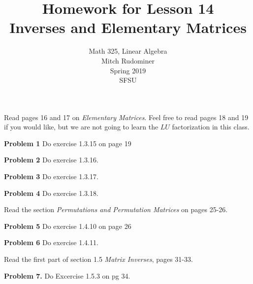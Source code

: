 \documentclass[oneside,12pt]{amsart}
\begin{document}
\title{Homework for Lesson 14 \\ Inverses and Elementary Matrices}
\author{Math 325, Linear Algebra \\ Mitch Rudominer \\ Spring 2019 \\ SFSU }
\date{}

\maketitle

\bigskip

Read pages 16 and 17 on \emph{Elementary Matrices}. Feel free to read pages
18 and 19 if you would like, but we are not going to learn the $LU$
factorization in this class.

\textbf{Problem 1} Do exercise 1.3.15 on page 19

\bigskip
\bigskip
\bigskip
\bigskip
\bigskip
\bigskip
\bigskip
\bigskip
\bigskip
\bigskip

\textbf{Problem 2} Do exercise 1.3.16.


\bigskip
\bigskip
\bigskip
\bigskip
\bigskip
\bigskip
\bigskip
\bigskip
\bigskip
\bigskip

\textbf{Problem 3} Do exercise 1.3.17.

\bigskip
\bigskip
\bigskip
\bigskip
\bigskip
\bigskip
\bigskip
\bigskip
\bigskip
\bigskip

\textbf{Problem 4} Do exercise 1.3.18.

\bigskip
\bigskip
\bigskip
\bigskip
\bigskip
\bigskip
\bigskip
\bigskip
\bigskip
\bigskip

Read the section \emph{Permutations and Permutation Matrices} on pages 25-26.

\medskip

\textbf{Problem 5} Do exercise 1.4.10 on page 26

\bigskip
\bigskip
\bigskip
\bigskip
\bigskip
\bigskip
\bigskip
\bigskip
\bigskip
\bigskip

\textbf{Problem 6} Do exercise 1.4.11.


\bigskip
\bigskip
\bigskip
\bigskip
\bigskip
\bigskip
\bigskip
\bigskip
\bigskip
\bigskip


Read the first part of section 1.5 \emph{Matrix Inverses}, pages 31-33.

\medskip

\textbf{Problem 7.} Do Excercise 1.5.3 on pg 34.

\bigskip
\bigskip
\bigskip
\bigskip
\bigskip
\bigskip
\bigskip
\bigskip
\bigskip
\bigskip
\end{document}
